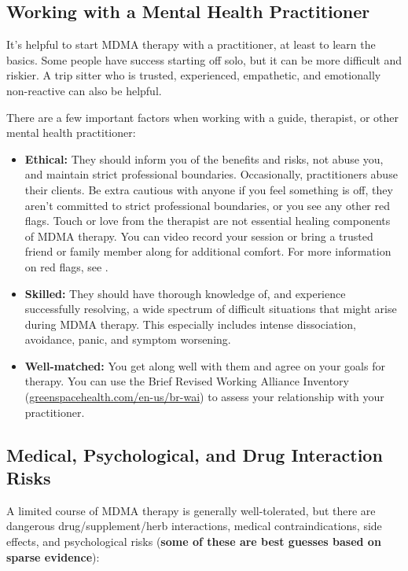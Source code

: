 \documentclass[11pt,oneside]{book}
\begin{document}
\subsection*{Working with a Mental Health Practitioner}
\label{practitioner}
It's helpful to start MDMA therapy with a practitioner, at least to learn the basics. Some people have success starting off solo, but it can be more difficult and riskier. A trip sitter who is trusted, experienced, empathetic, and emotionally non-reactive can also be helpful.

There are a few important factors when working with a guide, therapist, or other mental health practitioner:
\begin{itemize}
    \item \textbf{Ethical:} They should inform you of the benefits and risks, not abuse you, and maintain strict professional boundaries. Occasionally, practitioners abuse their clients. Be extra cautious with anyone if you feel something is off, they aren't committed to strict professional boundaries, or you see any other red flags. Touch or love from the therapist are not essential healing components of MDMA therapy. You can video record your session or bring a trusted friend or family member along for additional comfort. For more information on red flags, see \textcite{safetyFlags}.
    \item \textbf{Skilled:} They should have thorough knowledge of, and experience successfully resolving, a wide spectrum of difficult situations that might arise during MDMA therapy. This especially includes intense dissociation, avoidance, panic, and symptom worsening.
    \item \textbf{Well-matched:} You get along well with them and agree on your goals for therapy. You can use the Brief Revised Working Alliance Inventory (\href{https://greenspacehealth.com/en-us/br-wai}{greenspacehealth.com/en-us/br-wai}) to assess your relationship with your practitioner.
\end{itemize}

\subsection*{Medical, Psychological, and Drug Interaction Risks}
A limited course of MDMA therapy is generally well-tolerated, but there are dangerous drug/supplement/herb interactions, medical contraindications, side effects, and psychological risks (\textbf{some of these are best guesses based on sparse evidence}):
\end{document}
